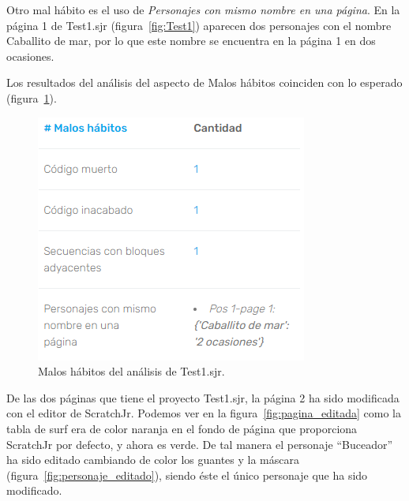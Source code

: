 \documentclass[a4paper, 12pt]{book}
\begin{document}
\vspace{5mm}
Otro mal hábito es el uso de \textit{Personajes con mismo nombre en una página}. En la página 1 de Test1.sjr (figura~\ref{fig:Test1}) aparecen dos personajes con el nombre Caballito de mar, por lo que este nombre se encuentra en la página 1 en dos ocasiones.


Los resultados del análisis del aspecto de Malos hábitos coinciden con lo esperado (figura~\ref{fig:maloshabitos_Test1}).

\begin{figure}[H]
  \centering
  \includegraphics[keepaspectratio]{img/maloshabitos_Test1.png}
  \caption{Malos hábitos del análisis de Test1.sjr.}
  \label{fig:maloshabitos_Test1}
\end{figure}

De las dos páginas que tiene el proyecto Test1.sjr, la página 2 ha sido modificada con el editor de ScratchJr. Podemos ver en la figura~\ref{fig:pagina_editada} como la tabla de surf era de color naranja en el fondo de página que proporciona ScratchJr por defecto, y ahora es verde.
De tal manera el personaje ``Buceador'' ha sido editado cambiando de color los guantes y la máscara (figura~\ref{fig:personaje_editado}), siendo éste el único personaje que ha sido modificado.
\end{document}
